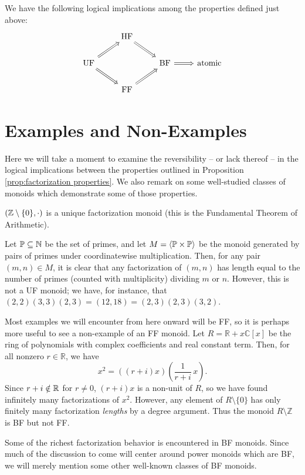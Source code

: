 \begin{prop} \label{prop:factorization properties}
We have the following logical implications among the properties defined just above:
\[\begin{tikzcd}[arrows = Rightarrow]
 & \text{HF} \arrow{dr}&  &  \\
\text{UF} \arrow{ur}\arrow{dr}  &  & \text{BF} \arrow{r}& \text{atomic} \\
 & \text{FF} \arrow{ur} &  & 
\end{tikzcd}\]
\end{prop}



\section{Examples and Non-Examples} \label{sec:examples}
Here we will take a moment to examine the reversibility -- or lack thereof -- in the logical implications between the properties outlined in Proposition \ref{prop:factorization properties}.
We also remark on some well-studied classes of monoids which demonstrate some of those properties.


\begin{eg} \label{eg:UF monoid}
$(\mathbb{Z}\setminus \{0\},\cdot)$ is a unique factorization monoid (this is the Fundamental Theorem of Arithmetic).
\end{eg} 

\begin{eg} \label{eg:HF monoid}
Let $\mathbb{P} \subseteq \mathbb{N}$ be the set of primes, and let $M = \langle \mathbb{P}\times \mathbb{P} \rangle$ be the monoid generated by pairs of primes under coordinatewise multiplication.  
Then, for any pair $(m,n)\in M$, it is clear that any factorization of $(m,n)$ has length equal to the number of primes (counted with multiplicity) dividing $m$ or $n$.
However, this is not a UF monoid; we have, for instance, that $(2,2)(3,3)(2,3) = (12,18) = (2,3)(2,3)(3,2)$.
\end{eg}

\begin{eg} \label{eg: non-FF monoid}
Most examples we will encounter from here onward will be FF, so it is perhaps more useful to see a non-example of an FF monoid.
Let $R = \mathbb{R} + x \mathbb{C}[x]$ be the ring of polynomials with complex coefficients and real constant term.
Then, for all nonzero $r\in \mathbb{R}$, we have
\[ x^2 = ((r+i)x)\left(\frac{1}{r+i}\,x\right). \]
Since $r+i\notin \mathbb{R}$ for $r\neq0$, $(r+i)x$ is a non-unit of $R$, so we have found infinitely many factorizations of $x^2$.
However, any element of $R\setminus \{0\}$ has only finitely many factorization \textit{lengths} by a degree argument.
Thus the monoid $R\setminus \mathbb{Z}$ is BF but not FF.
\end{eg}
Some of the richest factorization behavior is encountered in BF monoids.  
Since much of the discussion to come will center around power monoids which are BF, we will merely mention some other well-known classes of BF monoids.

